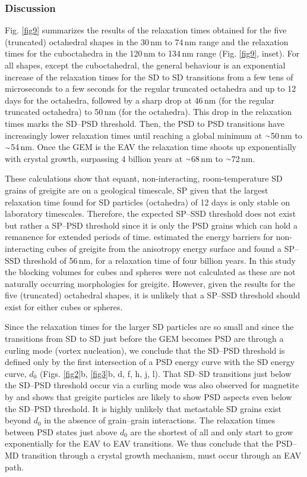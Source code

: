 \documentclass[review,authoryear]{elsarticle}
\newcommand{\roughly}{{\raise.17ex\hbox{$\scriptstyle\sim$}}}
\newcommand{\nm}{\,\text{nm}}
\begin{document}
\subsubsection{Discussion}
Fig. \ref{fig9} summarizes the results of the relaxation times obtained for the five (truncated) octahedral shapes in the 30$\nm$ to 74$\nm$ range and the relaxation times for the cuboctahedra in the 120$\nm$ to 134$\nm$ range (Fig. \ref{fig9}, inset). For all shapes, except the cuboctahedral, the general behaviour is an exponential increase of the relaxation times for the SD to SD transitions from a few tens of microseconds to a few seconds for the regular truncated octahedra and up to 12 days for the octahedra, followed by a sharp drop at 46$\nm$ (for the regular truncated octahedra) to 50$\nm$ (for the octahedra). This drop in the relaxation times marks the SD--PSD threshold. Then, the PSD to PSD transitions have increasingly lower relaxation times until reaching a global minimum at $\roughly$50$\nm$ to $\roughly$54$\nm$. Once the GEM is the EAV the relaxation time shoots up exponentially with crystal growth, surpassing 4 billion years at $\roughly$68$\nm$ to $\roughly$72$\nm$.\par

These calculations show that equant, non-interacting, room-temperature SD grains of greigite are on a geological timescale, SP given that the largest relaxation time found for SD particles (octahedra) of 12 days is only stable on laboratory timescales. Therefore, the expected SP--SSD threshold does not exist but rather a SP--PSD threshold since it is only the PSD grains which can hold a remanence for extended periods of time. \citet{Muxworthy2013} estimated the energy barriers for non-interacting cubes of greigite from the anisotropy energy surface and found a SP--SSD threshold of 56$\nm$, for a relaxation time of four billion years. In this study the blocking volumes for cubes and spheres were not calculated as these are not naturally occurring morphologies for greigite. However, given the results for the five (truncated) octahedral shapes, it is unlikely that a SP--SSD threshold should exist for either cubes or spheres.\par

Since the relaxation times for the larger SD particles are so small and since the transitions from SD to SD just before the GEM becomes PSD are through a curling mode (vortex nucleation), we conclude that the SD--PSD threshold is defined only by the first intersection of a PSD energy curve with the SD energy curve, $d_0$ (Figs. \ref{fig2}b, \ref{fig3}b, d, f, h, j, l). That SD--SD transitions just below the SD--PSD threshold occur via a curling mode was also observed for magnetite by \citet{Enkin1994} and shows that greigite particles are likely to show PSD aspects even below the SD--PSD threshold. It is highly unlikely that metastable SD grains exist beyond $d_0$ in the absence of grain--grain interactions. The relaxation times between PSD states just above $d_0$ are the shortest of all and only start to grow exponentially for the EAV to EAV transitions. We thus conclude that the PSD--MD transition through a crystal growth mechanism, must occur through an EAV path.\par
\end{document}
